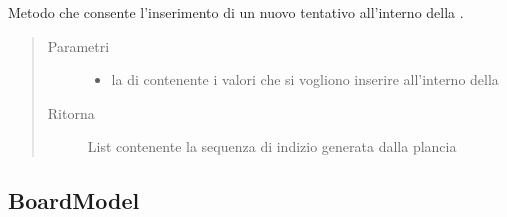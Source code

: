 \documentclass[letterpaper,10pt,italian,openany,oneside]{sphinxmanual}
\begin{document}
\begin{fulllineitems}
\label{\detokenize{source/it/unicam/cs/pa/mastermind/gamecore/BoardController:it.unicam.cs.pa.mastermind.gamecore.BoardController.insertNewAttempt(List)}}
Metodo che consente l’inserimento di un nuovo tentativo all’interno della .
\begin{quote}\begin{description}
\item[{Parametri}] \leavevmode\begin{itemize}
\item {} 
 \textendash{} la  di  contenente i valori che si vogliono inserire all’interno della 

\end{itemize}

\item[{Ritorna}] \leavevmode
List contenente la sequenza di  indizio generata dalla plancia

\end{description}\end{quote}

\end{fulllineitems}



\subsection{BoardModel}
\label{\detokenize{source/it/unicam/cs/pa/mastermind/gamecore/BoardModel:boardmodel}}\label{\detokenize{source/it/unicam/cs/pa/mastermind/gamecore/BoardModel::doc}}
\end{document}
